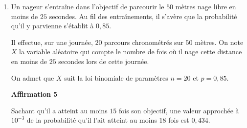 \begin{enumerate}
\item Un nageur s'entraîne dans l'objectif de parcourir le $50$ mètres nage libre en moins de $25$ secondes. Au fil des entraînements, il s'avère que la probabilité qu'il y parvienne s'établit à $0,85$.

Il effectue, sur une journée, $20$ parcours chronométrés sur $50$ mètres. On note $X$ la variable  aléatoire qui compte le nombre de fois où il nage cette distance en moins de $25$ secondes lors de cette journée.

On admet que $X$ suit la loi binomiale de paramètres $n = 20$ et $p = 0,85$.

\textbf{Affirmation 5}

Sachant qu'il a atteint au moins $15$ fois son objectif, une valeur approchée à $10^{-3}$ de la probabilité qu'il l'ait atteint au moins 18 fois est $0,434$.
\end{enumerate}

\bigskip
